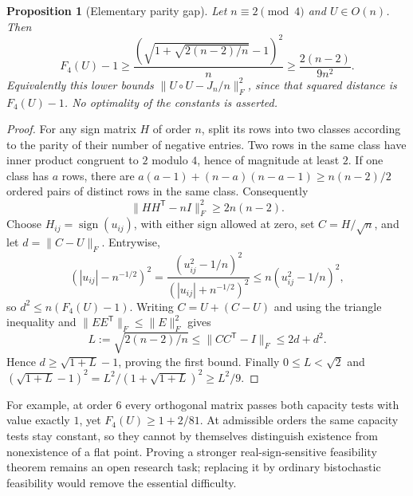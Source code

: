 \documentclass[11pt]{article}
\newtheorem{proposition}[theorem]{Proposition}
\begin{document}
\begin{proposition}[Elementary parity gap]
Let $n\equiv2\pmod4$ and $U\in O(n)$. Then
\[
 F_4(U)-1\ge
 \frac{\left(\sqrt{1+\sqrt{2(n-2)/n}}-1\right)^2}{n}
 \ge \frac{2(n-2)}{9n^2}.
\]
Equivalently this lower bounds
$\|U\circ U-J_n/n\|_F^2$, since that squared distance is $F_4(U)-1$.
No optimality of the constants is asserted.
\end{proposition}
\begin{proof}
For any sign matrix $H$ of order $n$, split its rows into two classes
according to the parity of their number of negative entries.
Two rows in the same class have inner product congruent to $2$
modulo $4$, hence of magnitude at least $2$. If one class has $a$
rows, there are $a(a-1)+(n-a)(n-a-1)\ge n(n-2)/2$ ordered pairs of
distinct rows in the same class. Consequently
\[
 \|HH^{\mathsf T}-nI\|_F^2\ge2n(n-2).
\]
Choose $H_{ij}=\operatorname{sign}(u_{ij})$, with either sign allowed
at zero, set $C=H/\sqrt n$, and let $d=\|C-U\|_F$.
Entrywise,
\[
 \left(|u_{ij}|-n^{-1/2}\right)^2
 =\frac{(u_{ij}^2-1/n)^2}{(|u_{ij}|+n^{-1/2})^2}
 \le n(u_{ij}^2-1/n)^2,
\]
so $d^2\le n(F_4(U)-1)$. Writing $C=U+(C-U)$ and using the
triangle inequality and $\|EE^{\mathsf T}\|_F\le\|E\|_F^2$ gives
\[
 L:=\sqrt{2(n-2)/n}\le\|CC^{\mathsf T}-I\|_F\le2d+d^2.
\]
Hence $d\ge\sqrt{1+L}-1$, proving the first bound.
Finally $0\le L<\sqrt2$ and
$(\sqrt{1+L}-1)^2=L^2/(1+\sqrt{1+L})^2\ge L^2/9$.
\end{proof}

For example, at order $6$ every orthogonal matrix passes both capacity
tests with value exactly $1$, yet $F_4(U)\ge1+2/81$.
At admissible orders the same capacity tests stay constant, so they
cannot by themselves distinguish existence from nonexistence of a flat
point. Proving a stronger real-sign-sensitive feasibility theorem remains
an open research task; replacing it by ordinary bistochastic feasibility
would remove the essential difficulty.
\end{document}
